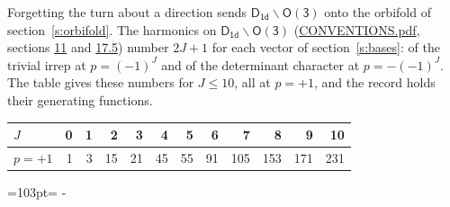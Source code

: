 \documentclass[10pt,a4paper]{article}
\newcommand{\needspace}[1]{\par\penalty-100\begingroup\dimen0=#1\relax\dimen2=\pagegoal
  \advance\dimen2-\pagetotal\ifdim\dimen0>\dimen2\relax\ifdim\dimen2>0pt\vfil\break\fi\fi
  \endgroup}
\numberwithin{equation}{section}
\newcommand{\grp}[1]{\mathsf{#1}}
\begin{document}
Forgetting the turn about a direction sends $\grp{D_{1d}}\backslash\grp{O(3)}$ onto the orbifold of section~\ref{s:orbifold}.
The harmonics on $\grp{D_{1d}}\backslash\grp{O(3)}$ (\href{../../CONVENTIONS.pdf}{CONVENTIONS.pdf}, sections \href{../../CONVENTIONS.pdf\#conv.11}{11} and \href{../../CONVENTIONS.pdf\#conv.17.5}{17.5}) number $2J + 1$ for each vector of section~\ref{s:bases}: of the trivial irrep at $p = (-1)^J$ and of the determinant character at $p = -(-1)^J$. The table gives these numbers for $J \le 10$, all at $p = +1$, and the record holds their generating functions.
{\small\setlength{\tabcolsep}{4pt}\begin{longtable}{@{}lrrrrrrrrrrr@{}}\toprule
$J$ & 0 & 1 & 2 & 3 & 4 & 5 & 6 & 7 & 8 & 9 & 10\\\midrule\endhead
\bottomrule\endfoot\endlastfoot
$p = +1$ & 1 & 3 & 15 & 21 & 45 & 55 & 91 & 105 & 153 & 171 & 231\\
\bottomrule\end{longtable}}
\needspace{103pt}
\end{document}
